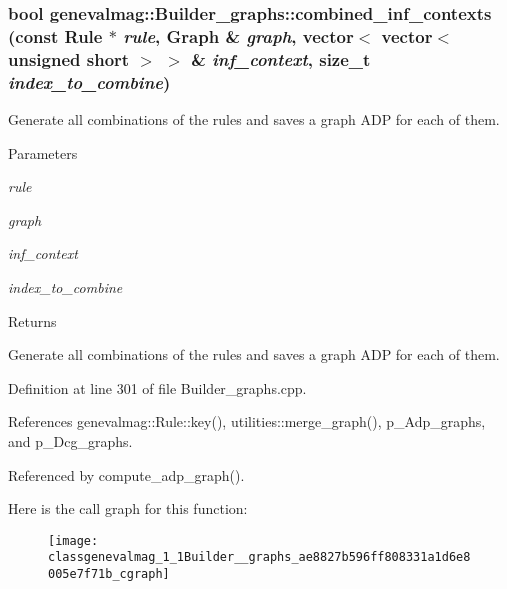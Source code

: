 \hypertarget{classgenevalmag_1_1Builder__graphs_ae8827b596ff808331a1d6e8005e7f71b}{
\subsubsection[{combined\_\-inf\_\-contexts}]{\setlength{\rightskip}{0pt plus 5cm}bool genevalmag::Builder\_\-graphs::combined\_\-inf\_\-contexts (const {\bf Rule} $\ast$ {\em rule}, \/  {\bf Graph} \& {\em graph}, \/  vector$<$ vector$<$ unsigned short $>$ $>$ \& {\em inf\_\-context}, \/  size\_\-t {\em index\_\-to\_\-combine})}}
\label{classgenevalmag_1_1Builder__graphs_ae8827b596ff808331a1d6e8005e7f71b}
Generate all combinations of the rules and saves a graph ADP for each of them. 
\begin{DoxyParams}{Parameters}
\item[{\em rule}]\item[{\em graph}]\item[{\em inf\_\-context}]\item[{\em index\_\-to\_\-combine}]\end{DoxyParams}
\begin{DoxyReturn}{Returns}

\end{DoxyReturn}
Generate all combinations of the rules and saves a graph ADP for each of them. 

Definition at line 301 of file Builder\_\-graphs.cpp.



References genevalmag::Rule::key(), utilities::merge\_\-graph(), p\_\-Adp\_\-graphs, and p\_\-Dcg\_\-graphs.



Referenced by compute\_\-adp\_\-graph().



Here is the call graph for this function:\nopagebreak
\begin{figure}[H]
\begin{center}
\leavevmode
\texttt{[image: classgenevalmag\_1\_1Builder\_\_graphs\_ae8827b596ff808331a1d6e8005e7f71b\_cgraph]}
\end{center}
\end{figure}




